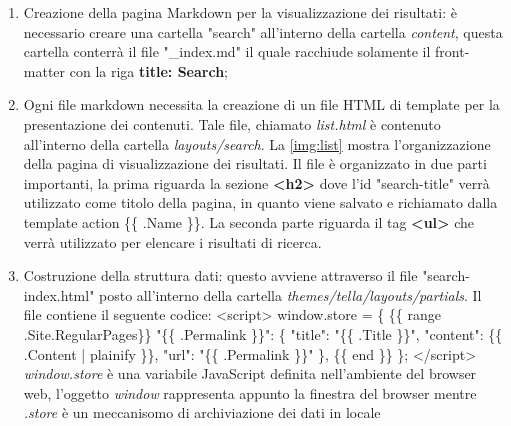 \documentclass[target=bach,aauheader=]{thud}
\begin{document}
\begin{enumerate}
    \item Creazione della pagina Markdown per la visualizzazione dei risultati: è necessario creare una cartella "search" all'interno della cartella \textit{content}, questa cartella conterrà il file "\_index.md" il quale racchiude solamente il front-matter con la riga \textbf{{\selectfont title: Search}};
    \item Ogni file markdown necessita la creazione di un file HTML di template per la presentazione dei contenuti. Tale file, chiamato \textit{list.html} è contenuto all'interno della cartella \textit{layouts/search}.
    \newline \newline
    La \cref{img:list} mostra l'organizzazione della pagina di visualizzazione dei risultati. Il file è organizzato in due parti importanti, la prima riguarda la sezione \textbf{\textless h2\textgreater} dove l'id "search-title" verrà utilizzato come titolo della pagina, in quanto viene salvato e richiamato dalla template action \{\{ .Name \}\}. 
    La seconda parte riguarda il tag \textbf{\textless ul\textgreater} che verrà utilizzato per elencare i risultati di ricerca.
    \item Costruzione della struttura dati: questo avviene attraverso il file "search-index.html" posto all'interno della cartella \textit{themes/tella/layouts/partials}. Il file contiene il seguente codice:
    \newline \newline \textless script\textgreater 
    \newline window.store = \{ 
        \newline \{\{ range .Site.RegularPages\}\}
        \newline "\{\{ .Permalink \}\}": \{
        \newline    "title": "\{\{ .Title  \}\}",
        \newline    "content": \{\{ .Content | plainify \}\}, 
        \newline    "url": "\{\{ .Permalink \}\}"
        \newline \},
        \newline \{\{ end \}\}
    \newline \};
    \newline \textless /script\textgreater
    \newline \newline
    \textit{window.store} è una variabile JavaScript definita nell'ambiente del browser web, l'oggetto \textit{window} rappresenta appunto la finestra del browser mentre \textit{.store} è un meccanisomo di archiviazione dei dati in locale 

\end{enumerate}
\end{document}
